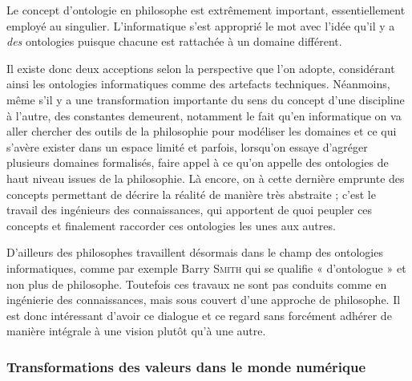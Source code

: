 Le concept d'ontologie en philosophe est extrêmement important, essentiellement employé au singulier. L'informatique s'est approprié le mot avec l'idée qu'il y a \emph{des} ontologies puisque chacune est rattachée à un domaine différent.

Il existe donc deux acceptions selon la perspective que l'on adopte, considérant ainsi les ontologies informatiques comme des artefacts techniques. Néanmoins, même s'il y a une transformation importante du sens du concept d'une discipline à l'autre, des constantes demeu\-rent, notamment le fait qu'en informatique on va aller chercher des outils de la philosophie pour modéliser les domaines et ce qui s'avère exister dans un espace limité et parfois, lorsqu'on essaye d'agréger plusieurs domaines formalisés, faire appel à ce qu'on appelle des ontologies de haut niveau issues de la philosophie. Là encore, on à cette dernière emprunte des concepts permettant de décrire la réalité de manière très abstraite ; c'est le travail des ingénieurs des connaissances, qui apportent de quoi peupler ces concepts et finalement raccorder ces ontologies les unes aux autres.

D'ailleurs des philosophes travaillent désormais dans le champ des ontologies informatiques, comme par exemple Barry \textsc{Smith} qui se qualifie « d'ontologue » et non plus de philosophe. Toutefois ces travaux ne sont pas conduits comme en ingénierie des connaissances, mais sous couvert d'une approche de philosophe. Il est donc intéressant d'avoir ce dialogue et ce regard sans forcément adhérer de manière intégrale à une vision plutôt qu'à une autre. 


\subsubsection[Transformations]{Transformations des valeurs dans le monde numérique}
\label{subsub:II.4.1.2}

